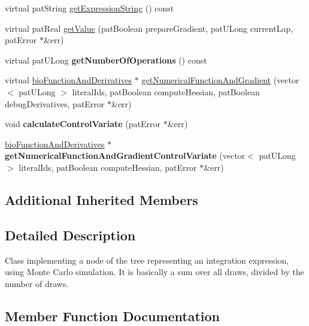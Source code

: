 \begin{DoxyCompactItemize}
\item 
virtual pat\+String \hyperlink{classbio_arith_monte_carlo_ab8753ef1b6b13b97c7991fe238869dbf}{get\+Expression\+String} () const
\item 
virtual pat\+Real \hyperlink{classbio_arith_monte_carlo_a0c1b08214fb40a9b77411c003bd022c5}{get\+Value} (pat\+Boolean prepare\+Gradient, pat\+U\+Long current\+Lap, pat\+Error $\ast$\&err)
\item 
\mbox{\label{classbio_arith_monte_carlo_a226b1b342241369bad8ed95c6827a8bb}} 
virtual pat\+U\+Long {\bfseries get\+Number\+Of\+Operations} () const
\item 
virtual \hyperlink{classbio_function_and_derivatives}{bio\+Function\+And\+Derivatives} $\ast$ \hyperlink{classbio_arith_monte_carlo_a6d0d957fe1a3eb664f07bda138d2624a}{get\+Numerical\+Function\+And\+Gradient} (vector$<$ pat\+U\+Long $>$ literal\+Ids, pat\+Boolean compute\+Hessian, pat\+Boolean debug\+Derivatives, pat\+Error $\ast$\&err)
\item 
\mbox{\label{classbio_arith_monte_carlo_a33485fa7f36e8ce1e8f8de4edcc5b8de}} 
void {\bfseries calculate\+Control\+Variate} (pat\+Error $\ast$\&err)
\item 
\mbox{\label{classbio_arith_monte_carlo_a26b6b99bb0bbedb3d7682d717141bdb8}} 
\hyperlink{classbio_function_and_derivatives}{bio\+Function\+And\+Derivatives} $\ast$ {\bfseries get\+Numerical\+Function\+And\+Gradient\+Control\+Variate} (vector$<$ pat\+U\+Long $>$ literal\+Ids, pat\+Boolean compute\+Hessian, pat\+Error $\ast$\&err)
\end{DoxyCompactItemize}
\subsection*{Additional Inherited Members}


\subsection{Detailed Description}
Class implementing a node of the tree representing an integration expression, using Monte Carlo simulation. It is basically a sum over all draws, divided by the number of draws. 

\subsection{Member Function Documentation}
\mbox{\label{classbio_arith_monte_carlo_a91a8c51e8741c4667d1a61eb738f20f5}} 
